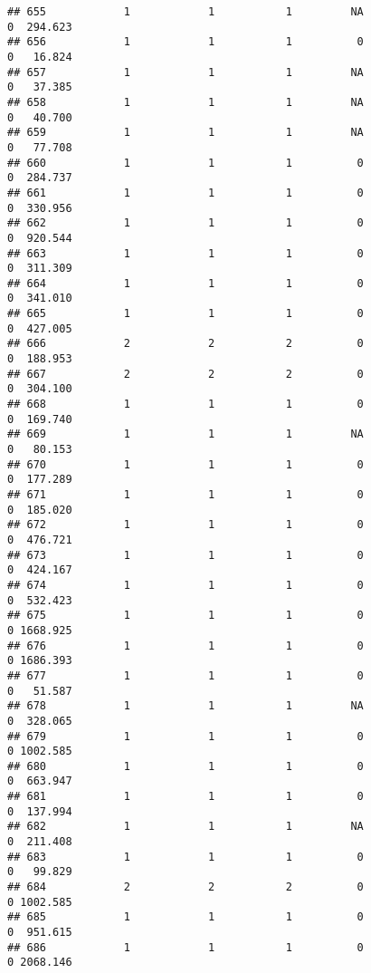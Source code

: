 \documentclass[
]{article}
\begin{document}
\begin{verbatim}
## 655            1            1           1         NA                0  294.623
## 656            1            1           1          0                0   16.824
## 657            1            1           1         NA                0   37.385
## 658            1            1           1         NA                0   40.700
## 659            1            1           1         NA                0   77.708
## 660            1            1           1          0                0  284.737
## 661            1            1           1          0                0  330.956
## 662            1            1           1          0                0  920.544
## 663            1            1           1          0                0  311.309
## 664            1            1           1          0                0  341.010
## 665            1            1           1          0                0  427.005
## 666            2            2           2          0                0  188.953
## 667            2            2           2          0                0  304.100
## 668            1            1           1          0                0  169.740
## 669            1            1           1         NA                0   80.153
## 670            1            1           1          0                0  177.289
## 671            1            1           1          0                0  185.020
## 672            1            1           1          0                0  476.721
## 673            1            1           1          0                0  424.167
## 674            1            1           1          0                0  532.423
## 675            1            1           1          0                0 1668.925
## 676            1            1           1          0                0 1686.393
## 677            1            1           1          0                0   51.587
## 678            1            1           1         NA                0  328.065
## 679            1            1           1          0                0 1002.585
## 680            1            1           1          0                0  663.947
## 681            1            1           1          0                0  137.994
## 682            1            1           1         NA                0  211.408
## 683            1            1           1          0                0   99.829
## 684            2            2           2          0                0 1002.585
## 685            1            1           1          0                0  951.615
## 686            1            1           1          0                0 2068.146

\end{verbatim}
\end{document}
